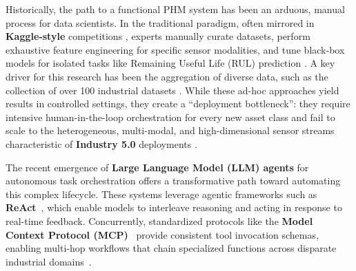 \documentclass[sigconf, screen, nonacm]{acmart}
\begin{document}
Historically, the path to a functional PHM system has been an arduous, manual process for data scientists. In the traditional paradigm, often mirrored in \textbf{Kaggle-style} competitions \cite{ibm_enterprise_ops_2025}, experts manually curate datasets, perform exhaustive feature engineering for specific sensor modalities, and tune black-box models for isolated tasks like Remaining Useful Life (RUL) prediction \cite{hamilton2026neurosymbolicaipredictivemaintenance}. A key driver for this research has been the aggregation of diverse data, such as the collection of over 100 industrial datasets \cite{vanderVenIndustrialDatasets}. While these ad-hoc approaches yield results in controlled settings, they create a ``deployment bottleneck'': they require intensive human-in-the-loop orchestration for every new asset class and fail to scale to the heterogeneous, multi-modal, and high-dimensional sensor streams characteristic of \textbf{Industry 5.0} deployments \cite{wang2025itformer, yang2025phmbenchdomainspecificbenchmarkingframework}.

The recent emergence of \textbf{Large Language Model (LLM) agents} for autonomous task orchestration offers a transformative path toward automating this complex lifecycle. These systems leverage agentic frameworks such as \textbf{ReAct}~\cite{yao2023reactsynergizingreasoningacting}, which enable models to interleave reasoning and acting in response to real-time feedback. Concurrently, standardized protocols like the \textbf{Model Context Protocol (MCP)}~\cite{mcp_intro_2024} provide consistent tool invocation schemas, enabling multi-hop workflows that chain specialized functions across disparate industrial domains~\cite{wang2025mcpbenchbenchmarkingtoolusingllm}. 
\end{document}
